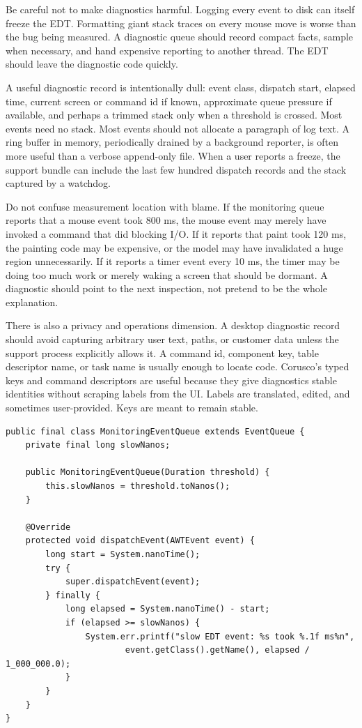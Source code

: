 Be careful not to make diagnostics harmful. Logging every event to disk can itself freeze the EDT. Formatting giant stack traces on every mouse move is worse than the bug being measured. A diagnostic queue should record compact facts, sample when necessary, and hand expensive reporting to another thread. The EDT should leave the diagnostic code quickly.

A useful diagnostic record is intentionally dull: event class, dispatch start, elapsed time, current screen or command id if known, approximate queue pressure if available, and perhaps a trimmed stack only when a threshold is crossed. Most events need no stack. Most events should not allocate a paragraph of log text. A ring buffer in memory, periodically drained by a background reporter, is often more useful than a verbose append-only file. When a user reports a freeze, the support bundle can include the last few hundred dispatch records and the stack captured by a watchdog.

Do not confuse measurement location with blame. If the monitoring queue reports that a mouse event took 800 ms, the mouse event may merely have invoked a command that did blocking I/O. If it reports that paint took 120 ms, the painting code may be expensive, or the model may have invalidated a huge region unnecessarily. If it reports a timer event every 10 ms, the timer may be doing too much work or merely waking a screen that should be dormant. A diagnostic should point to the next inspection, not pretend to be the whole explanation.

There is also a privacy and operations dimension. A desktop diagnostic record should avoid capturing arbitrary user text, paths, or customer data unless the support process explicitly allows it. A command id, component key, table descriptor name, or task name is usually enough to locate code. Corusco's typed keys and command descriptors are useful because they give diagnostics stable identities without scraping labels from the UI. Labels are translated, edited, and sometimes user-provided. Keys are meant to remain stable.

\begin{lstlisting}[caption={An EventQueue that reports slow event dispatch.}]
public final class MonitoringEventQueue extends EventQueue {
    private final long slowNanos;

    public MonitoringEventQueue(Duration threshold) {
        this.slowNanos = threshold.toNanos();
    }

    @Override
    protected void dispatchEvent(AWTEvent event) {
        long start = System.nanoTime();
        try {
            super.dispatchEvent(event);
        } finally {
            long elapsed = System.nanoTime() - start;
            if (elapsed >= slowNanos) {
                System.err.printf("slow EDT event: %s took %.1f ms%n",
                        event.getClass().getName(), elapsed / 1_000_000.0);
            }
        }
    }
}
\end{lstlisting}

